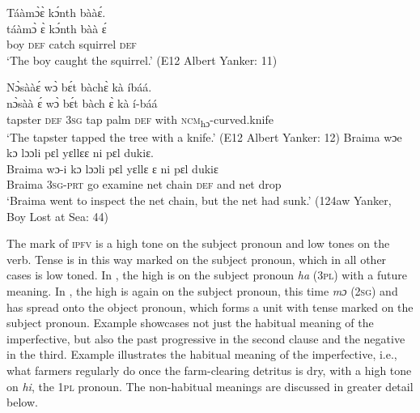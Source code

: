 \ea%
    \label{ex:111}
\ea Táàmɔ̀ɛ̀ kɔ́nth bààɛ́.\\
\gll táàmɔ̀    ɛ̀    kɔ́nth    bàà    ɛ́\\
boy    \textsc{def}  catch    squirrel  \textsc{def}\\
\glt ‘The boy caught the squirrel.' (E12 Albert Yanker: 11)

\ex  Nɔ̀sààɛ́ wɔ̀ bɛ́t bàchɛ̀ kà íbáá.\\
\gll nɔ̀sàà    ɛ́    wɔ̀    bɛ́t    bàch  ɛ̀    kà    í-báá\\
tapster  \textsc{def}  3\textsc{sg}  tap  palm  \textsc{def}  with  \textsc{ncm}\textsubscript{hɔ}-curved.knife\\
    \glt ‘The tapster tapped the tree with a knife.' (E12 Albert Yanker: 12)
\ex  Braima wɔe kɔ lɔɔli  pɛl   yɛllɛɛ ni pɛl dukiɛ.\\
\gll Braima  wɔ-i      kɔ    lɔɔli    pɛl    yɛllɛ    ɛ    ni    pɛl    dukiɛ\\
Braima  \textsc{3sg-prt}    go    examine  net  chain    \textsc{def}  and  net  drop\\
\glt ‘Braima went to inspect the net chain, but the net had sunk.' (124aw Yanker, Boy Lost at Sea: 44)
\z
\z

The mark of \textsc{ipfv} is a high tone on the subject pronoun and low tones on the verb. Tense is in this way marked on the subject pronoun, which in all other cases is low toned. In , the high is on the subject pronoun \textit{ha} (\textsc{3pl}) with a future meaning. In , the high is again on the subject pronoun, this time \textit{mɔ} (\textsc{2sg}) and has spread onto the object pronoun, which forms a unit with tense marked on the subject pronoun. Example  showcases not just the habitual meaning of the imperfective, but also the past progressive in the second clause and the negative in the third. Example  illustrates the habitual meaning of the imperfective, i.e., what farmers regularly do once the farm-clearing detritus is dry, with a high tone on \textit{hi}, the \textsc{1pl} pronoun. The non-habitual meanings are discussed in greater detail below.

